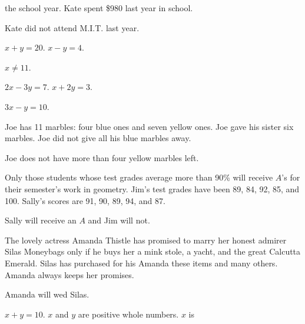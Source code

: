 \documentclass[11pt]{book}
\theoremstyle{bkplain}
\theoremstyle{XIplainnote}
\theoremstyle{bkplain}
\theoremstyle{bkplain}
\begin{document}
\begin{exercisecols}
\begin{exlist}
\begin{hyp}
      the school year. Kate spent \$980 last year in school.\end{hyp}
      \begin{thmclaim}Kate did not attend M.I.T. last year.\end{thmclaim}
\item \begin{hyp}$x + y = 20$. $x - y = 4$.\end{hyp}
      \begin{thmclaim}$x \neq 11$.\end{thmclaim}
\item \begin{hyp}$2x - 3y = 7$. $x + 2y = 3$.\end{hyp}
      \begin{thmclaim}$3x - y = 10$.\end{thmclaim}
\item \begin{hyp}Joe has 11 marbles: four blue ones and seven yellow ones. Joe
      gave his sister six marbles. Joe did not give all his blue marbles
      away.\end{hyp}
      \begin{thmclaim}Joe does not have more than four yellow marbles
      left.\end{thmclaim}
\item \begin{hyp}Only those students whose test grades average more than 90\% will
      receive $A$'s for their semester's work in geometry. Jim's test grades have
      been 89, 84, 92, 85, and 100. Sally's scores are 91, 90, 89, 94, and
      87.\end{hyp}
      \begin{thmclaim}Sally will receive an $A$ and Jim will not.\end{thmclaim}
\item \begin{hyp}The lovely actress Amanda Thistle has promised to marry her
      honest admirer Silas Moneybags only if he buys her a mink stole, a yacht,
      and the great Calcutta Emerald. Silas has purchased for his Amanda these
      items and many others. Amanda always keeps her promises.\end{hyp}
      \begin{thmclaim}Amanda will wed Silas.\end{thmclaim}
\item \begin{hyp}$x + y = 10$. $x$ and $y$ are positive whole numbers. $x$ is

\end{hyp}
\end{exlist}
\end{exercisecols}
\end{document}
